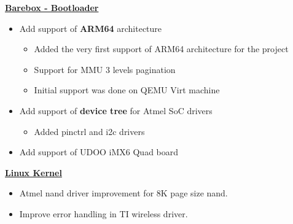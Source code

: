 \documentclass[10pt,a4paper]{altacv}
\begin{document}
\begin{paracol}{2}
\medskip
\reversemarginpar 
\textbf{\textcolor{accent}{\href{https://git.pengutronix.de/cgit/barebox/log/?qt=author&q=poggi.raph@gmail.com}{Barebox - Bootloader}}}
\begin{itemize}
\item Add support of \textbf{\textcolor{bold}{ARM64}} architecture
    \begin{itemize}
	\fontsize{10pt}{12pt}\selectfont %
        \renewcommand{\labelitemii}{-} %
        \item Added the very first support of ARM64 architecture for the project
        \item Support for MMU 3 levels pagination
        \item Initial support was done on QEMU Virt machine
    \end{itemize}
\item Add support of \textbf{\textcolor{bold}{device tree}} for Atmel SoC drivers
    \begin{itemize}
	\fontsize{10pt}{12pt}\selectfont %
        \renewcommand{\labelitemii}{-} %
        \item Added pinctrl and i2c drivers
    \end{itemize}
\item Add support of UDOO iMX6 Quad board
\end{itemize}

\medskip
\textbf{\textcolor{accent}{\href{https://git.kernel.org/pub/scm/linux/kernel/git/torvalds/linux.git/log/?qt=author&q=poggi.raph@gmail.com}{Linux Kernel}}}
\begin{itemize}
\item Atmel nand driver improvement for 8K page size nand.
\item Improve error handling in TI wireless driver.
\end{itemize}

\bigskip



\bigskip



\smallskip


\end{paracol}
\end{document}
